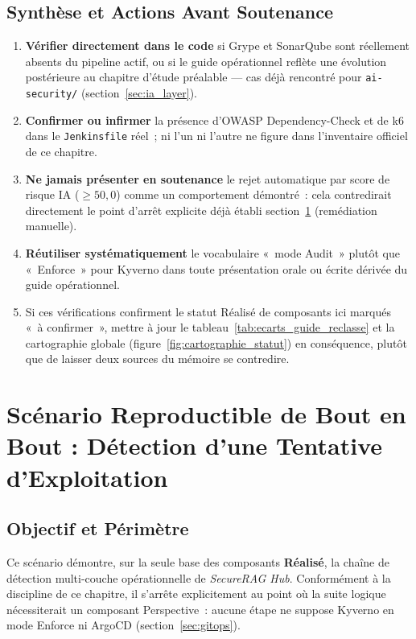 \subsection{Synthèse et Actions Avant Soutenance}
\label{sub:synthese_guide_reclasse}

\begin{enumerate}
    \item \textbf{Vérifier directement dans le code} si Grype et SonarQube sont réellement absents du pipeline actif, ou si le guide opérationnel reflète une évolution postérieure au chapitre d'étude préalable --- cas déjà rencontré pour \texttt{ai-security/} (section~\ref{sec:ia_layer}).
    \item \textbf{Confirmer ou infirmer} la présence d'OWASP Dependency-Check et de k6 dans le \texttt{Jenkinsfile} réel~; ni l'un ni l'autre ne figure dans l'inventaire officiel de ce chapitre.
    \item \textbf{Ne jamais présenter en soutenance} le rejet automatique par score de risque IA ($\geq 50{,}0$) comme un comportement démontré~: cela contredirait directement le point d'arrêt explicite déjà établi section~\ref{sec:scenario_attaque_e2e} (remédiation manuelle).
    \item \textbf{Réutiliser systématiquement} le vocabulaire «~mode Audit~» plutôt que «~Enforce~» pour Kyverno dans toute présentation orale ou écrite dérivée du guide opérationnel.
    \item Si ces vérifications confirment le statut Réalisé de composants ici marqués «~à confirmer~», mettre à jour le tableau~\ref{tab:ecarts_guide_reclasse} et la cartographie globale (figure~\ref{fig:cartographie_statut}) en conséquence, plutôt que de laisser deux sources du mémoire se contredire.
\end{enumerate}
\section{Scénario Reproductible de Bout en Bout : Détection d'une Tentative d'Exploitation}
\label{sec:scenario_attaque_e2e}

\subsection{Objectif et Périmètre}

Ce scénario démontre, sur la seule base des composants \textbf{Réalisé}, la chaîne de détection multi-couche opérationnelle de \textit{SecureRAG Hub}. Conformément à la discipline de ce chapitre, il s'arrête explicitement au point où la suite logique nécessiterait un composant Perspective~: aucune étape ne suppose Kyverno en mode Enforce ni ArgoCD (section~\ref{sec:gitops}).

